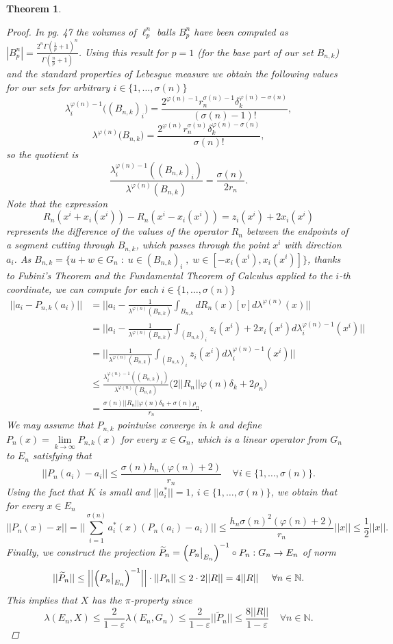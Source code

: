\documentclass[11pt]{amsart}
\newcommand{\ep}{\varepsilon}
\newcommand{\N}{\mathbb{N}}
\newcommand\restr[2]{{%
  \left.\kern-\nulldelimiterspace %
  #1 %
  \vphantom{\big|} %
  \right|_{#2} %
  }}
\newcommand{\<}{\langle}
\renewcommand{\>}{\rangle}
\newtheorem{theorem}{Theorem}[section]
\theoremstyle{definition}
\theoremstyle{remark}
\numberwithin{equation}{section}
\begin{document}
\begin{theorem}
\begin{proof}
In \cite{Bra+14} pg. 47
the volumes of $\ell_p^n$ balls $B_p^n$ have been computed as $|B_p^n|=\frac{2^n\Gamma(\frac1p+1)^n}{\Gamma(\frac np+1)}$. Using this result for $p=1$ (for the base part of our set $B_{n,k}$) and the standard
properties of Lebesgue measure we obtain the following values for our sets for arbitrary $i\in\{1,\dots,\sigma(n)\}$
$$\lambda^{\varphi(n)-1}_i\big((B_{n,k})_i\big)=\frac{2^{\varphi(n)-1}r_n^{\sigma(n)-1}\delta_k^{\varphi(n)-\sigma(n)}}{(\sigma(n)-1)!},$$
$$\lambda^{\varphi(n)}\big(B_{n,k}\big)=\frac{2^{\varphi(n)}r_n^{\sigma(n)}\delta_k^{\varphi(n)-\sigma(n)}}{\sigma(n)!},$$
so the quotient is
$$\frac{\lambda^{\varphi(n)-1}_i((B_{n,k})_i)}{\lambda^{\varphi(n)}(B_{n,k})}=\frac{\sigma(n)}{2r_n}.$$
Note that the expression
$$R_n(x^i+x_i(x^i))-R_n(x^i-x_i(x^i))=z_i(x^i)+2x_i(x^i)$$
represents the difference of the values of the operator $R_n$ between the endpoints of a segment cutting through $B_{n,k}$, which passes through the point $x^i$ with direction $a_i$.
As $B_{n,k}=\{u+w\in G_n\;:\;u\in(B_{n,k})_i\;,\;w\in[-x_i(x^i),x_i(x^i)]\}$, thanks to Fubini's Theorem and the Fundamental Theorem of Calculus applied to the $i$-th coordinate, we can compute for each $i\in\{1,\dots,\sigma(n)\}$
$$\begin{aligned}\big|\big|a_i-P_{n,k}(a_i)\big|\big| 
&=\bigg|\bigg|a_i- \frac{1}{\lambda^{\varphi(n)}(B_{n,k})}\int_{B_{n,k}}dR_n(x)[v]d\lambda^{\varphi(n)}(x)\bigg|\bigg|\\ 
&=\bigg|\bigg|a_i- \frac{1}{\lambda^{\varphi(n)}(B_{n,k})}\int_{(B_{n,k})_i}z_i(x^i)+2x_i(x^i)d\lambda^{\varphi(n)-1}_i(x^i) \bigg|\bigg|\\&=\bigg|\bigg|\frac{1}{\lambda^{\varphi(n)}(B_{n,k})} \int_{(B_{n,k})_i}z_i(x^i)d\lambda^{\varphi(n)-1}_i(x^i) \bigg|\bigg|\\
&\le\frac{\lambda^{\varphi(n)-1}_i((B_{n,k})_i)}{\lambda^{\varphi(n)}(B_{n,k})}\big(2||R_n||\varphi(n)\delta_k+2\rho_n\big)\\
&=\frac{\sigma(n)||R_n||\varphi(n)\delta_k+\sigma(n)\rho_n}{r_n}.
\end{aligned}$$
We may assume that $P_{n,k}$ pointwise converge in $k$ and define $P_n(x)=\lim\limits_{k\to\infty}P_{n,k}(x)$ for every $x\in G_n$, which is a linear operator from $G_n$ to $E_n$ satisfying that
$$||P_n(a_i)-a_i||\le\frac{\sigma(n)h_{n}(\varphi(n)+2)}{r_n}\;\;\;\;\forall i\in\{1,\dots,\sigma(n)\}.$$
Using the fact that $K$ is small and $||a_i^*||=1$, $i\in\{1,\dots,\sigma(n)\}$, we obtain that for every $x\in E_n$
$$||P_n(x)-x||=\bigg|\bigg| \sum\limits_{i=1}^{\sigma(n)}a_i^*(x)(P_n(a_i)-a_i) \bigg|\bigg|\le\frac{h_{n}{\sigma(n)}^2(\varphi(n)+2)}{r_n}||x||\le\frac{1}{2}||x||.$$
Finally, we construct the projection $\widetilde{P}_n=\Big(\restr{P_n}{E_n}\Big)^{-1}\circ P_n:G_n\rightarrow E_n$ of norm
$$||\widetilde{P}_n||\le\Big|\Big| \Big(\restr{P_n}{E_n}\Big)^{-1} \Big|\Big|\cdot||P_n||\le2\cdot 2||R|| =4||R||\;\;\;\;\;\forall n\in\N.$$
This implies that $X$ has the $\pi$-property since
$$\lambda(E_n,X)\le\frac{2}{1-\ep}\lambda(E_n,G_n)\le\frac{2}{1-\ep}||\widetilde{P}_n||\le\frac{8||R||}{1-\ep}\;\;\;\;\forall n\in\N.$$
\end{proof}
\end{theorem}
\end{document}
